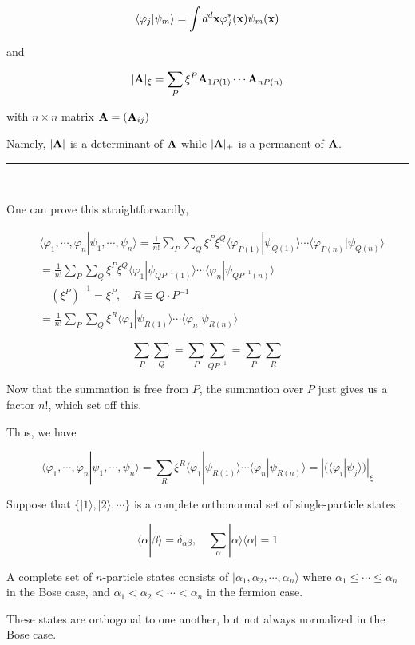 \[\langle\varphi_j|\psi_m\rangle = \int d^d {\bf x}\varphi_j^*({\bf x})\psi_m({\bf x}) \]

and

\[|{\bf A}|_{\xi} = \sum_{P}\xi^P {\bf A}_{1P(1)}\cdots{\bf A}_{nP(n)} \]

with $n\times n$ matrix ${\bf A} = ({\bf A}_{ij})$

Namely, $|{\bf A}|$ is a determinant of ${\bf A}$ while $|{\bf A}|_+$ is a permanent of ${\bf A}$. 

\hrule

\ 

One can prove this straightforwardly, 

\[\begin{split}
&\langle\varphi_1,\cdots,\varphi_n|\psi_1,\cdots,\psi_n\rangle =\frac{1}{n!}\sum_P\sum_Q\xi^P\xi^Q\langle\varphi_{P(1)}|\psi_{Q(1)}\rangle\cdots\langle\varphi_{P(n)}|\psi_{Q(n)}\rangle \\
& = \frac{1}{n!}\sum_{P}\sum_{Q}\xi^P\xi^Q\langle\varphi_1|\psi_{QP^{-1}(1)}\rangle\cdots\langle\varphi_n|\psi_{QP^{-1}(n)}\rangle\\
&\quad (\xi^P)^{-1} = \xi^P,\quad R\equiv Q\cdot P^{-1}\\
&= \frac{1}{n!} \sum_P\sum_Q\xi^R\langle\varphi_1|\psi_{R(1)}\rangle\cdots\langle\varphi_n|\psi_{R(n)}\rangle
\end{split}\]

\[\sum_P\sum_Q = \sum_P\sum_{QP^{-1}}=\sum_P\sum_R \]

Now that the summation is free from $P$, the summation over $P$ just gives us a factor $n!$, which set off this. 

Thus, we have

\[\langle\varphi_1,\cdots,\varphi_n|\psi_1,\cdots,\psi_n\rangle = \sum_R\xi^R\langle\varphi_1|\psi_{R(1)}\rangle\cdots\langle\varphi_n|\psi_{R(n)}\rangle = |(\langle\varphi_i|\psi_j\rangle)|_\xi \]

Suppose that $\{|1\rangle,|2\rangle,\cdots\}$ is a complete orthonormal set of single-particle states:

\[\langle\alpha|\beta\rangle = \delta_{\alpha\beta},\quad\sum_{\alpha}|\alpha\rangle\langle\alpha| = 1 \]

A complete set of $n$-particle states consists of $|\alpha_1,\alpha_2,\cdots,\alpha_n\rangle$ where $\alpha_1\le\cdots\le\alpha_n$ in the Bose case, and $\alpha_1<\alpha_2<\cdots<\alpha_n$ in the fermion case. 

These states are orthogonal to one another, but not always normalized in the Bose case. 

